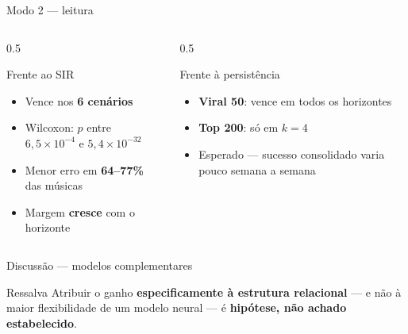 \documentclass[aspectratio=169]{beamer}
\newcommand{\dest}[1]{\textcolor{ufprB}{\textbf{#1}}}
\newcommand{\verd}[1]{\textcolor{ufprC}{\textbf{#1}}}
\begin{document}
\begin{frame}{Modo 2 --- leitura}
  \vfill
  \begin{columns}[T]
  \begin{column}{0.5\textwidth}
    \begin{block}{Frente ao SIR}
      \begin{itemize}
        \item Vence nos \dest{6 cenários}
        \item Wilcoxon: $p$ entre $6{,}5\!\times\!10^{-4}$ e $5{,}4\!\times\!10^{-32}$
        \item Menor erro em \dest{64--77\%} das músicas
        \item Margem \dest{cresce} com o horizonte
      \end{itemize}
    \end{block}
  \end{column}
  \begin{column}{0.5\textwidth}
    \begin{alertblock}{Frente à persistência}
      \begin{itemize}
        \item \verd{Viral 50}: vence em todos os horizontes
        \item \dest{Top 200}: só em $k{=}4$
        \item Esperado --- sucesso consolidado varia pouco semana a semana
      \end{itemize}
    \end{alertblock}
  \end{column}
  \end{columns}
  \vfill
\end{frame}

\begin{frame}{Discussão --- modelos complementares}
  \begin{center}
  \end{center}
  \vfill
  \begin{alertblock}{Ressalva}
    Atribuir o ganho \dest{especificamente à estrutura relacional} --- e não à maior flexibilidade
    de um modelo neural --- é \dest{hipótese, não achado estabelecido}.
  \end{alertblock}
  \vfill
\end{frame}
\end{document}

